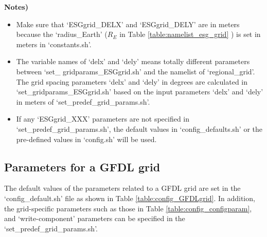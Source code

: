 \documentclass[11pt,fleqn]{report}              %
\begin{document}
\begin{enumerate}
{\bf Notes)}
\begin{itemize}
\item Make sure that `ESGgrid\_DELX' and `ESGgrid\_DELY' are in meters because the `radius\_Earth' ($R_E$ in Table \ref{table:namelist_esg_grid} ) is set in meters in `constants.sh'.
\item The variable names of `delx' and `dely' means totally different parameters between `set\_ gridparams\_ESGgrid.sh' and the namelist of `regional\_grid'. The grid spacing parameters `delx' and `dely' in degrees are calculated in `set\_gridparams\_ESGgrid.sh' based on the input parameters `delx' and `dely' in meters of `set\_predef\_grid\_params.sh'. 
\item If any `ESGgrid\_XXX' parameters are not specified in `set\_predef\_grid\_params.sh', the default values in `config\_defaults.sh' or the pre-defined values in `config.sh' will be used. 
\end{itemize}

\end{enumerate}


\subsection{Parameters for a GFDL grid}
\label{subsec:new_predef_grid_gfdl}

The default values of the parameters related to a GFDL grid are set in the `config\_default.sh' file as shown in Table \ref{table:config_GFDLgrid}. In addition, the grid-specific parameters such as those in Table \ref{table:config_configparam}, and `write-component' parameters can be specified in the `set\_predef\_grid\_params.sh'.
\end{document}
